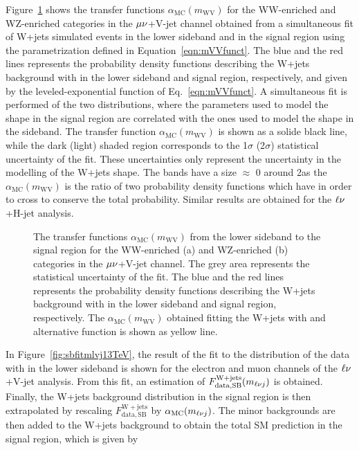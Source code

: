 Figure~\ref{fig:alphasWV_13TeV} shows the transfer functions $\alpha_\mathrm{MC}(m_\mathrm{WV})$ for the WW-enriched and WZ-enriched categories in the $\mu\nu$+V-jet channel obtained from a simultaneous fit of W+jets simulated events in the lower sideband and in the signal region using the parametrization defined in Equation~\ref{eqn:mVVfunct}.
The blue and the red lines represents the probability density functions describing the W+jets background with \mJ in the lower sideband and signal region, respectively, and given by the leveled-exponential function of Eq.~\ref{eqn:mVVfunct}. A simultaneous fit is performed of the two distributions, where the parameters used to model the shape in the signal region are correlated with the ones used to model the shape in the sideband.
The transfer function $\alpha_\mathrm{MC}(m_\mathrm{WV})$  is shown as a solide black line, while the dark (light) shaded region corresponds to the 1$\sigma$ (2$\sigma$) statistical uncertainty of the fit.
These uncertainties only represent the uncertainty in the modelling of the W+jets shape. The bands have a size $\approx$ 0 around 2\TeV as the $\alpha_\mathrm{MC}(m_\mathrm{WV})$ is the ratio of two probability density functions which have in order to cross to conserve the total probability. Similar results are obtained for the $\ell\nu$+H-jet analysis.

\begin{figure}[!htb]
\centering
{}
\caption{The transfer functions $\alpha_\mathrm{MC}(m_\mathrm{WV})$ from the lower \mJ sideband to the signal region for the WW-enriched (a) and WZ-enriched (b) categories in the $\mu\nu$+V-jet channel. The grey area represents the statistical uncertainty of the fit. The blue and the red lines represents the probability density functions describing the W+jets background with \mJ in the lower sideband and signal region, respectively. The $\alpha_\mathrm{MC}(m_\mathrm{WV})$ obtained fitting the W+jets with and alternative function is shown as yellow line.}
\label{fig:alphasWV_13TeV}
\end{figure}

In Figure~\ref{fig:sbfitmlvj13TeV}, the result of the fit to the \mWV distribution of the data with \mJ in the lower sideband is shown for the electron and muon channels of the $\ell\nu$+V-jet analysis.
From this fit, an estimation of $F_\mathrm{data, SB}^{\mathrm{W+jets}}(m_{\ell\nu j})$ is obtained.
Finally, the W+jets background distribution in the signal region is then extrapolated by rescaling $F_\mathrm{data, SB}^{\mathrm{W+jets}}$ by $\alpha_\mathrm{MC}(m_{\ell\nu j})$.
The minor backgrounds are then added to the W+jets background to obtain the total SM prediction in the signal region, which is given by

